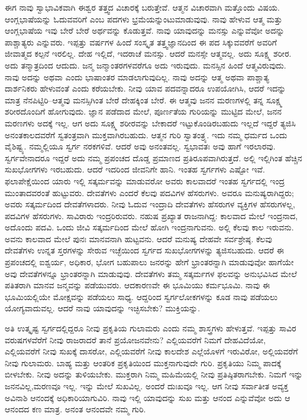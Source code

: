 ಈಗ ನಾವು ಸ್ವಾಭಾವಿಕವಾಗಿ ಈಶ್ವರ ತತ್ತ್ವದ ವಿಚಾರಕ್ಕೆ ಬರುತ್ತೇವೆ. ಆತ್ಮನ ವಿಚಾರವಾಗಿ ಮತ್ತೊಂದು ವಿಷಯ. ಆಂಗ್ಲಭಾಷೆಯನ್ನು ಓದುವವರಿಗೆ  ಎಂಬ ಪದಗಳು ಭ್ರಮೆಯನ್ನುಂಟುಮಾಡುವುವು. ನಾವು ಹೇಳುವ ಆತ್ಮ ಮತ್ತು ಆಂಗ್ಲಭಾಷೆಯ ಇವು ಬೇರೆ ಬೇರೆ ಅರ್ಥವನ್ನು ಕೊಡುತ್ತವೆ. ನಾವು ಯಾವುದನ್ನು ಮನಸ್ಸು  ಎನ್ನುವೆವೋ ಅದನ್ನು ಪಾಶ್ಚಾತ್ಯರು  ಎನ್ನುವರು. ಇಪ್ಪತ್ತು ವರ್ಷಗಳ ಹಿಂದೆ ಸಂಸ್ಕೃತ ತತ್ತ್ವಜ್ಞಾನದಿಂದ ಈ ಪದ ಸಿಕ್ಕುವವರೆಗೆ ಅವರಿಗೆ ಜೀವಾತ್ಮದ ಕಲ್ಪನೆ ಇರಲಿಲ್ಲ. ದೇಹ ಇಲ್ಲಿದೆ, ಇದರಾಚೆ ಮನಸ್ಸು. ಆದರೆ ಮನಸ್ಸೇ ಆತ್ಮವಲ್ಲ. ಅದು ಸೂಕ್ಷ್ಮ ಶರೀರ. ಅದು ತನ್ಮಾತ್ರದಿಂದ ಆದುದು. ಜನ್ಮ ಜನ್ಮಾಂತರಗಳವರೆಗೂ ಅದು ಇರುವುದು. ಮನಸ್ಸಿನ ಹಿಂದೆ ಆತ್ಮವಿರುವುದು. ನಾವು ಅದನ್ನು  ಅಥವಾ  ಎಂದು ಭಾಷಾಂತರ ಮಾಡಲಾಗು\-ವುದಿಲ್ಲ. ನಾವು ಅದನ್ನು ಆತ್ಮ ಅಥವಾ ಪಾಶ್ಚಾತ್ಯ ದಾರ್ಶನಿಕರು ಹೇಳುವಂತೆ  ಎಂದು ಕರೆಯಬೇಕು. ನೀವು ಯಾವ ಪದವನ್ನಾದರೂ ಉಪಯೋಗಿಸಿ, ಆದರೆ ಇದನ್ನು ಮಾತ್ರ ನೆನಪಿಟ್ಟಿರಿ–ಆತ್ಮವು ಮನಸ್ಸಿಗಿಂತ ಬೇರೆ ದೇಹಕ್ಕಿಂತ ಬೇರೆ. ಈ ಆತ್ಮವು ಜನನ ಮರಣಗಳಲ್ಲಿ ತನ್ನ ಸೂಕ್ಷ್ಮ ಶರೀರದೊಂದಿಗೆ ಹೋಗುವುದು. ಜ್ಞಾನ ಪಡೆದಾದ ಮೇಲೆ, ಪೂರ್ಣತೆಯ ಗುರಿಯನ್ನು ಮುಟ್ಟಿದ ಮೇಲೆ, ಜನನ ಮರಣಗಳು ಅದಕ್ಕೆ ಇಲ್ಲ. ಆಗ ಅದು ಸೂಕ್ಷ್ಮ ಶರೀರವನ್ನು ಬೇಕಾದರೆ ಇಟ್ಟುಕೊಂಡಿರಬಹುದು ಇಲ್ಲದೆ ಇದ್ದರೆ ತ್ಯಜಿಸಿ ಅನಂತಕಾಲದವರೆಗೆ ಸ್ವತಂತ್ರವಾಗಿ ಮುಕ್ತವಾಗಿರಬಹುದು. ಆತ್ಮನ ಗುರಿ ಸ್ವಾತಂತ್ರ್ಯ. ಇದು ನಮ್ಮ ಧರ್ಮದ ಒಂದು ವೈಶಿಷ್ಟ್ಯ. ನಮ್ಮಲ್ಲಿಯೂ ಸ್ವರ್ಗ ನರಕಗಳಿವೆ. ಆದರೆ ಅವು ಅನಂತವಲ್ಲ. ಸ್ವಭಾವತಃ ಅವು ಹಾಗೆ ಇರಲಾರವು. ಸ್ವರ್ಗವೇನಾದರೂ ಇದ್ದರೆ ಅದು ನಮ್ಮ ಪ್ರಪಂಚದ ದೊಡ್ಡ ಪ್ರಮಾಣದ ಪ್ರತಿರೂಪವಾಗಿರುತ್ತದೆ. ಅಲ್ಲಿ ಇಲ್ಲಿಗಿಂತ ಹೆಚ್ಚಿನ ಸುಖಭೋಗಗಳು ಇರಬಹುದು. ಆದರೆ ಇದರಿಂದ ಜೀವನಿಗೇ ಹಾನಿ. ಇಂತಹ ಸ್ವರ್ಗಗಳು ಎಷ್ಟೋ ಇವೆ. ಫಲಾಪೇಕ್ಷೆಯಿಂದ ಯಾರು ಇಲ್ಲಿ ಸತ್ಕರ್ಮವನ್ನು ಮಾಡುವರೋ ಅವರು ಕಾಲವಾದರೆ ಇಂತಹ ಸ್ವರ್ಗದಲ್ಲಿ ಇಂದ್ರ ಮುಂತಾದವರಂತೆ ಹುಟ್ಟುವರು. ದೇವತೆಗಳು ಎಂದರೆ ಕೆಲವು ಪದವಿಗಳ ಹೆಸರುಗಳು. ಅವರೂ ಮನುಷ್ಯರಾಗಿದ್ದರು; ಅವರು ಸತ್ಕರ್ಮದಿಂದ ದೇವತೆಗಳಾದರು. ನೀವು ಓದುವ ಇಂದ್ರಾದಿ ದೇವತೆಗಳು ಹೆಸರುಗಳ ವ್ಯಕ್ತಿಗಳ ಹೆಸರುಗಳಲ್ಲ, ಪದವಿಗಳ ಹೆಸರುಗಳು. ಸಾವಿರಾರು ಇಂದ್ರರಿರುವರು. ನಹುಷ ಪ್ರಖ್ಯಾತ ರಾಜನಾಗಿದ್ದ: ಕಾಲವಾದ ಮೇಲೆ ಇಂದ್ರನಾದ, ಅದೊಂದು ಪದವಿ. ಒಂದು ಜೀವಿ ಸತ್ಕರ್ಮದಿಂದ ಮೇಲೆ ಹೋಗಿ ಇಂದ್ರನಾಗುವನು. ಅಲ್ಲಿ ಕೆಲವು ಕಾಲ ಇರುವನು. ಅವನು ಕಾಲವಾದ ಮೇಲೆ ಪುನಃ ಮಾನವನಾಗಿ ಹುಟ್ಟವನು. ಆದರೆ ಮನುಷ್ಯ ದೇಹವೇ ಸರ್ವಶ್ರೇಷ್ಠ. ಕೆಲವು ದೇವತೆಗಳು ಉನ್ನತ ಸ್ತರಗಳನ್ನು ಸೇರುವ ಇಚ್ಛೆಯಿಂದ ಸ್ವರ್ಗದ ಸುಖಭೋಗಗಳನ್ನು ತ್ಯಜಿಸಬಹುದು. ಆದರೆ ಈ ಪ್ರಪಂಚದಲ್ಲಿ ಐಶ್ವರ್ಯ, ಅಧಿಕಾರ, ಭೋಗ ಬಹುಪಾಲು ಜನರನ್ನು ಹೇಗೆ ಭ್ರಾಂತರನ್ನಾಗಿ ಮಾಡುವುವೋ ಹಾಗೆಯೇ ಅವು ದೇವತೆಗಳನ್ನೂ ಭ್ರಾಂತರನ್ನಾಗಿ ಮಾಡುವುವು. ದೇವತೆಗಳು ತಮ್ಮ ಸತ್ಕರ್ಮಗಳ ಫಲವನ್ನು ಅನುಭವಿಸಿದ ಮೇಲೆ ಪತಿತರಾಗಿ ಮಾನವ ಜನ್ಮವನ್ನು ಪಡೆಯುವರು. ಆದಕಾರಣವೇ ಈ ಭೂಮಿಯು ಕರ್ಮಭೂಮಿ. ನಾವು ಈ ಭೂಮಿಯಲ್ಲಿಯೇ ಮೋಕ್ಷವನ್ನು ಪಡೆಯಲು ಸಾಧ್ಯ. ಆದ್ದರಿಂದ ಸ್ವರ್ಗಲೋಕಗಳನ್ನು ಕೂಡ ನಾವು ಪಡೆಯಲು ಯೋಗ್ಯವಾದುವಲ್ಲ. ಆದರೆ ನಾವು ಯಾವುದನ್ನು ಇಚ್ಛಿಸಬೇಕು? ಮುಕ್ತಿಯನ್ನು.

ಅತಿ ಉತ್ಕೃಷ್ಟ ಸ್ವರ್ಗದಲ್ಲಿದ್ದರೂ ನೀವು ಪ್ರಕೃತಿಯ ಗುಲಾಮರು ಎಂದು ನಮ್ಮ ಶಾಸ್ತ್ರಗಳು ಹೇಳುತ್ತವೆ. ಇಪ್ಪತ್ತು ಸಾವಿರ ವರುಷಗಳವೆರೆಗೆ ನೀವು ರಾಜರಾದರೆ ತಾನೆ ಪ್ರಯೋಜನವೇನು? ಎಲ್ಲಿಯವರೆಗೆ ನಿಮಗೆ ದೇಹವಿದೆಯೋ, ಎಲ್ಲಿಯವರೆಗೆ ನೀವು ಸುಖಕ್ಕೆ ದಾಸರೋ, ಎಲ್ಲಿಯವರೆಗೆ ನೀವು ಕಾಲದೇಶ ಎಲ್ಲೆಯೊಳಗೆ ಇರುವಿರೋ, ಅಲ್ಲಿಯವರೆಗೆ ನೀವು ಗುಲಾಮರು. ಬಾಹ್ಯ ಮತ್ತು ಆಂತರಿಕ ಪ್ರಕೃತಿಯಿಂದ ಮುಕ್ತನಾಗುವುದೇ ಗುರಿ. ಪ್ರಕೃತಿಯು ನಿಮ್ಮ ಪಾದಕ್ಕೆ ಬೀಳಬೇಕು. ನೀವು ಅದನ್ನು ತುಳಿಯಬೇಕು. ಮುಕ್ತರಾಗಿ ನಿಮ್ಮ ಮಹಿಮೆಯಲ್ಲಿ ನೀವು ಪ್ರತಿಷ್ಠಿತರಾಗಬೇಕು. ನಿಮಗೆ ಇನ್ನು ಜನನವಿಲ್ಲ,\break ಮರಣವೂ ಇಲ್ಲ. ಇನ್ನು ಮೇಲೆ ಸುಖವಿಲ್ಲ. ಅಂದರೆ ದುಃಖವೂ ಇಲ್ಲ. ಆಗ ನೀವು ಸರ್ವಾತೀತ ಅವ್ಯಕ್ತ ಅವಿನಾಶಿ ಆನಂದಕ್ಕೆ ಅಧಿಕಾರಿಯಾಗುವಿರಿ. ನಾವು ಇಲ್ಲಿ ಯಾವುದನ್ನು ಸುಖ ಮತ್ತು ಆನಂದ ಎನ್ನುವೆವೋ ಅದು ಆ ಆನಂದದ ಕಣ ಮಾತ್ರ. ಅನಂತ ಆನಂದವೇ ನಮ್ಮ ಗುರಿ.

